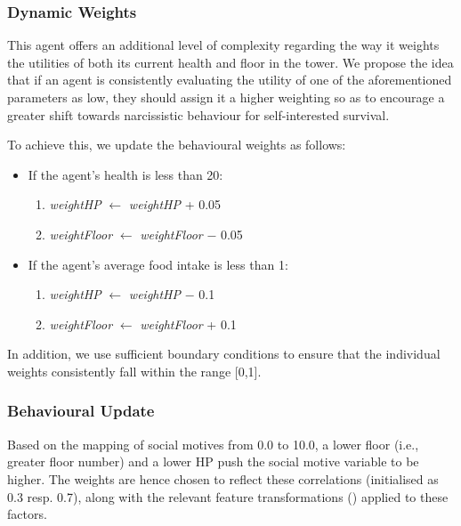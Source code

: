 \subsubsection{Dynamic Weights}

This agent offers an additional level of complexity regarding the way it weights the utilities of both its current health and floor in the tower. We propose the idea that if an agent is consistently evaluating the utility of one of the aforementioned parameters as low, they should assign it a higher weighting so as to encourage a greater shift towards narcissistic behaviour for self-interested survival.

To achieve this, we update the behavioural weights as follows:

\begin{itemize}
    \item If the agent's health is less than 20:
    \begin{enumerate}
        \item \textit{weightHP} $\leftarrow$ \textit{weightHP} + 0.05
        \item \textit{weightFloor} $\leftarrow$ \textit{weightFloor} $-$ 0.05
    \end{enumerate}
    \item If the agent's average food intake is less than 1:
    \begin{enumerate}
        \item \textit{weightHP} $\leftarrow$ \textit{weightHP} $-$ 0.1
        \item \textit{weightFloor} $\leftarrow$ \textit{weightFloor} + 0.1
    \end{enumerate}
\end{itemize}

In addition, we use sufficient boundary conditions to ensure that the individual weights consistently fall within the range [0,1].

\subsubsection{Behavioural Update}

Based on the mapping of social motives from 0.0 to 10.0, a lower floor (i.e., greater floor number) and a lower HP push the social motive variable to be higher. The weights are hence chosen to reflect these correlations (initialised as 0.3 resp. 0.7), along with the relevant feature transformations () applied to these factors.

